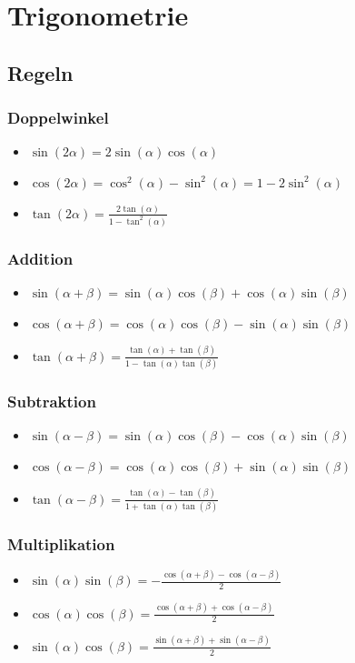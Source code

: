 \documentclass[a4paper,10pt]{article}
\begin{document}
\section{Trigonometrie}

\subsection{Regeln}

\subsubsection{Doppelwinkel}
\begin{itemize}
 \item $\sin(2\alpha) = 2 \sin(\alpha) \cos(\alpha)$
 \item $\cos(2\alpha) = \cos^2(\alpha) - \sin^2(\alpha) = 1 - 2 \sin^2(\alpha)$
 \item $\tan(2\alpha) = \frac{2\tan(\alpha)}{1 - \tan^2(\alpha)}$
\end{itemize}

\subsubsection{Addition}
\begin{itemize}
 \item $\sin(\alpha + \beta) = \sin(\alpha) \cos(\beta) + \cos(\alpha) \sin(\beta)$
 \item $\cos(\alpha + \beta) = \cos(\alpha) \cos(\beta) - \sin(\alpha) \sin(\beta)$
 \item $\tan(\alpha + \beta) = \frac{\tan(\alpha) + \tan(\beta)}{1 - \tan(\alpha) \tan(\beta)}$
\end{itemize}

\subsubsection{Subtraktion}
\begin{itemize}
 \item $\sin(\alpha - \beta) = \sin(\alpha) \cos(\beta) - \cos(\alpha)\sin(\beta)$
 \item $\cos(\alpha - \beta) = \cos(\alpha) \cos(\beta) + \sin(\alpha)\sin(\beta)$
 \item $\tan(\alpha - \beta) = \frac{\tan(\alpha) - \tan(\beta)}{1+\tan(\alpha) \tan(\beta)}$
\end{itemize}

\subsubsection{Multiplikation}
\begin{itemize}
 \item $\sin(\alpha) \sin(\beta) = -\frac{\cos(\alpha + \beta) - \cos(\alpha - \beta)}{2}$
 \item $\cos(\alpha) \cos(\beta) =  \frac{\cos(\alpha + \beta) + \cos(\alpha - \beta)}{2}$
 \item $\sin(\alpha) \cos(\beta) =  \frac{\sin(\alpha + \beta) + \sin(\alpha - \beta)}{2}$
\end{itemize}
\end{document}
